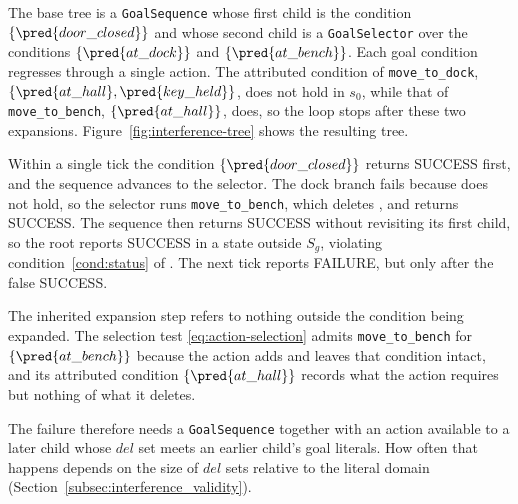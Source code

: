     The base tree is a \texttt{GoalSequence} whose first child is the condition $\{\pred{door\_closed}\}$ and whose second child is a \texttt{GoalSelector} over the conditions $\{\pred{at\_dock}\}$ and $\{\pred{at\_bench}\}$. 
    Each goal condition regresses through a single action.
    The attributed condition of \texttt{move\_to\_dock}, $\{\pred{at\_hall}, \pred{key\_held}\}$, does not hold in $s_0$, while that of \texttt{move\_to\_bench}, $\{\pred{at\_hall}\}$, does, so the loop stops after these two expansions.
    Figure~\ref{fig:interference-tree} shows the resulting tree.

    

    Within a single tick the condition $\{\pred{door\_closed}\}$ returns SUCCESS first, and the sequence advances to the selector.
    The dock branch fails because  does not hold, so the selector runs \texttt{move\_to\_bench}, which deletes , and returns SUCCESS.
    The sequence then returns SUCCESS without revisiting its first child, so the root reports SUCCESS in a state outside $S_g$, violating condition~\ref{cond:status} of \probprime.
    The next tick reports FAILURE, but only after the false SUCCESS.

    The inherited expansion step refers to nothing outside the condition being expanded.
    The selection test \eqref{eq:action-selection} admits \texttt{move\_to\_bench} for $\{\pred{at\_bench}\}$ because the action adds  and leaves that condition intact, and its attributed condition $\{\pred{at\_hall}\}$ records what the action requires but nothing of what it deletes.

    The failure therefore needs a \texttt{GoalSequence} together with an action available to a later child whose $del$ set meets an earlier child's goal literals.
    How often that happens depends on the size of $del$ sets relative to the literal domain (Section~\ref{subsec:interference_validity}).

